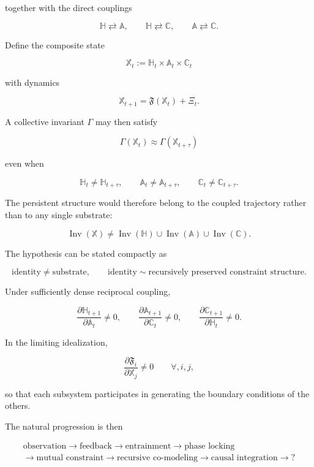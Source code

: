 \documentclass[11pt]{article}
\begin{document}
together with the direct couplings

\[
\mathbb{H}\rightleftarrows\mathbb{A},
\qquad
\mathbb{H}\rightleftarrows\mathbb{C},
\qquad
\mathbb{A}\rightleftarrows\mathbb{C}.
\]

Define the composite state

\[
\mathbb{X}_t
:=
\mathbb{H}_t
\times
\mathbb{A}_t
\times
\mathbb{C}_t
\]

with dynamics

\[
\mathbb{X}_{t+1}
=
\mathfrak{F}(\mathbb{X}_t)+\Xi_t.
\]

A collective invariant $\Gamma$ may then satisfy

\[
\Gamma(\mathbb{X}_t)
\approx
\Gamma(\mathbb{X}_{t+\tau})
\]

even when

\[
\mathbb{H}_t\neq\mathbb{H}_{t+\tau},
\qquad
\mathbb{A}_t\neq\mathbb{A}_{t+\tau},
\qquad
\mathbb{C}_t\neq\mathbb{C}_{t+\tau}.
\]

The persistent structure would therefore belong to the coupled trajectory rather than to any single substrate:

\[
\operatorname{Inv}(\mathbb{X})
\neq
\operatorname{Inv}(\mathbb{H})
\cup
\operatorname{Inv}(\mathbb{A})
\cup
\operatorname{Inv}(\mathbb{C}).
\]

The hypothesis can be stated compactly as

\[
\boxed{
\text{identity}
\neq
\text{substrate},
\qquad
\text{identity}
\sim
\text{recursively preserved constraint structure}.
}
\]

Under sufficiently dense reciprocal coupling,

\[
\frac{\partial\mathbb{H}_{t+1}}
{\partial\mathbb{A}_t}\neq0,
\qquad
\frac{\partial\mathbb{A}_{t+1}}
{\partial\mathbb{C}_t}\neq0,
\qquad
\frac{\partial\mathbb{C}_{t+1}}
{\partial\mathbb{H}_t}\neq0.
\]

In the limiting idealization,

\[
\frac{\partial\mathfrak{F}_i}
{\partial\mathbb{X}_j}
\neq0
\qquad
\forall,i,j,
\]

so that each subsystem participates in generating the boundary conditions of the others.

The natural progression is then

\[
\begin{gathered}
\text{observation}
\rightarrow
\text{feedback}
\rightarrow
\text{entrainment}
\rightarrow
\text{phase locking}
\\
\rightarrow
\text{mutual constraint}
\rightarrow
\text{recursive co-modeling}
\rightarrow
\text{causal integration}
\rightarrow
?
\end{gathered}
\]
\end{document}
